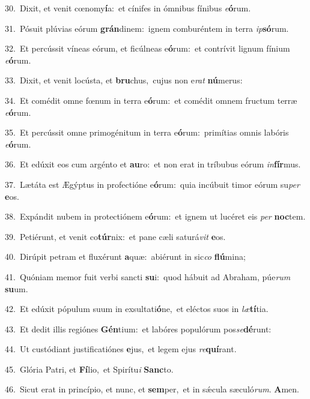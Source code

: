 {\numbfont\textcolor{\numbcolor}{30.}}~Dixit, et venit cœnomy\-\textbf{í}\-a:~\star et cínifes in ómnibus fínibus \textit{e}\-\textbf{ó}rum.\par
{\numbfont\textcolor{\numbcolor}{31.}}~Pósuit plúvias eórum \textbf{grán}\-dinem:~\star ignem comburéntem in terra \textit{ip}\-\textbf{só}rum.\par
{\numbfont\textcolor{\numbcolor}{32.}}~Et percússit víneas eórum, et ficúlneas e\-\textbf{ó}\-rum:~\star et contrívit lignum fínium \textit{e}\-\textbf{ó}rum.\par
{\numbfont\textcolor{\numbcolor}{33.}}~Dixit, et venit locústa, et \textbf{bru}\-chus,~\star cujus non e\textit{rat} \textbf{nú}\-merus:\par
{\numbfont\textcolor{\numbcolor}{34.}}~Et comédit omne fœnum in terra e\-\textbf{ó}\-rum:~\star et comédit omnem fructum terræ \textit{e}\-\textbf{ó}rum.\par
{\numbfont\textcolor{\numbcolor}{35.}}~Et percússit omne primogénitum in terra e\-\textbf{ó}\-rum:~\star primítias omnis labóris \textit{e}\-\textbf{ó}rum.\par
{\numbfont\textcolor{\numbcolor}{36.}}~Et edúxit eos cum argénto et \textbf{au}\-ro:~\star et non erat in tríbubus eórum \textit{in}\-\textbf{fír}mus.\par
{\numbfont\textcolor{\numbcolor}{37.}}~Lætáta est Ægýptus in profectióne e\-\textbf{ó}\-rum:~\star quia incúbuit timor eórum su\textit{per} \textbf{e}\-os.\par
{\numbfont\textcolor{\numbcolor}{38.}}~Expándit nubem in protectiónem e\-\textbf{ó}\-rum:~\star et ignem ut lucéret eis \textit{per} \textbf{noc}\-tem.\par
{\numbfont\textcolor{\numbcolor}{39.}}~Petiérunt, et venit co\-\textbf{túr}\-nix:~\star et pane cæli saturá\textit{vit} \textbf{e}\-os.\par
{\numbfont\textcolor{\numbcolor}{40.}}~Dirúpit petram et fluxérunt \textbf{a}\-quæ:~\star abiérunt in sic\textit{co} \textbf{flú}\-mina;\par
{\numbfont\textcolor{\numbcolor}{41.}}~Quóniam memor fuit verbi sancti \textbf{su}\-i:~\star quod hábuit ad Abraham, púe\textit{rum} \textbf{su}\-um.\par
{\numbfont\textcolor{\numbcolor}{42.}}~Et edúxit pópulum suum in exsultati\-\textbf{ó}\-ne,~\star et eléctos suos in \textit{læ}\-\textbf{tí}tia.\par
{\numbfont\textcolor{\numbcolor}{43.}}~Et dedit illis regiónes \textbf{Gén}\-tium:~\star et labóres populórum pos\-\textit{se}\-\textbf{dé}runt:\par
{\numbfont\textcolor{\numbcolor}{44.}}~Ut custódiant justificatiónes \textbf{e}\-jus,~\star et legem ejus \textit{re}\-\textbf{quí}rant.\par
{\numbfont\textcolor{\numbcolor}{45.}}~Glória Patri, et \textbf{Fí}\-lio,~\star et Spirítu\textit{i} \textbf{Sanc}\-to.\par
{\numbfont\textcolor{\numbcolor}{46.}}~Sicut erat in princípio, et nunc, et \textbf{sem}\-per,~\star et in sǽcula sæculó\-\textit{rum}\-. \textbf{A}\-men.\par
